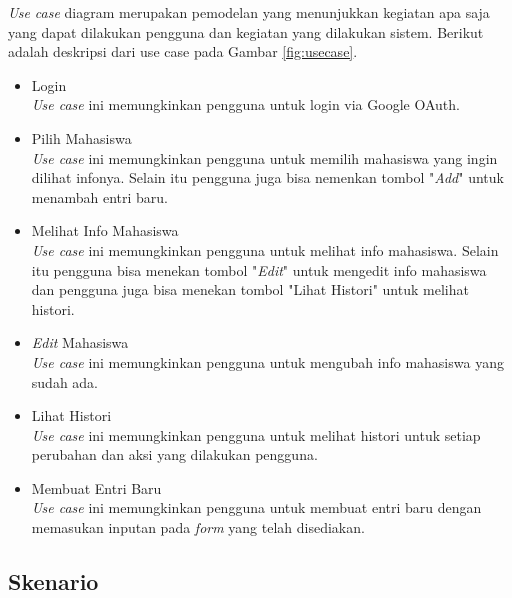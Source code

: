 {\it Use case} diagram merupakan pemodelan yang menunjukkan kegiatan apa saja
yang dapat dilakukan pengguna dan kegiatan yang dilakukan sistem. Berikut adalah
deskripsi dari use case pada Gambar \ref{fig:usecase}.

\begin{itemize}
\item Login\\
{\it Use case} ini memungkinkan pengguna untuk login via Google OAuth.
\item Pilih Mahasiswa\\
{\it Use case} ini memungkinkan pengguna untuk memilih mahasiswa yang ingin dilihat
infonya. Selain itu pengguna juga bisa nemenkan tombol "{\it Add}" untuk
menambah entri baru.
\item Melihat Info Mahasiswa\\
{\it Use case} ini memungkinkan pengguna untuk melihat info mahasiswa. Selain itu
pengguna bisa menekan tombol "{\it Edit}" untuk mengedit info mahasiswa dan
pengguna juga bisa menekan tombol "Lihat Histori" untuk melihat histori.
\item {\it Edit} Mahasiswa\\
{\it Use case} ini memungkinkan pengguna untuk mengubah info mahasiswa yang
sudah ada.
\item Lihat Histori\\
{\it Use case} ini memungkinkan pengguna untuk melihat histori untuk setiap perubahan
dan aksi yang dilakukan pengguna.
\item Membuat Entri Baru\\
{\it Use case} ini memungkinkan pengguna untuk membuat entri baru dengan memasukan
inputan pada {\it form} yang telah disediakan.
\end{itemize}

\subsection{Skenario}

